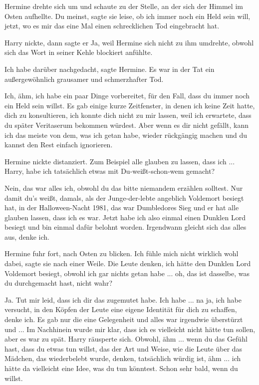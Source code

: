 Hermine drehte sich um und schaute zu der Stelle, an der sich der Himmel im
Osten aufhellte. \glqq{}Du meinst\grqq{}, sagte sie leise, \glqq{}ob ich immer
noch ein Held sein will, jetzt, wo es mir das eine Mal einen schrecklichen Tod
eingebracht hat.\grqq{}

Harry nickte, dann sagte er \glqq{}Ja\grqq{}, weil Hermine sich nicht zu ihm
umdrehte, obwohl sich das Wort in seiner Kehle blockiert anfühlte.

\glqq{}Ich habe darüber nachgedacht\grqq{}, sagte Hermine. \glqq{}Es war in der
Tat ein außergewöhnlich grausamer und schmerzhafter Tod.\grqq{}

\glqq{}Ich, ähm, ich habe ein paar Dinge vorbereitet, für den Fall, dass du immer
noch ein Held sein willst. Es gab einige kurze Zeitfenster, in denen ich keine
Zeit hatte, dich zu konsultieren, ich konnte dich nicht zu mir lassen, weil ich
erwartete, dass du später Veritaserum bekommen würdest. Aber wenn es dir nicht
gefällt, kann ich das meiste von dem, was ich getan habe, wieder rückgängig
machen und du kannst den Rest einfach ignorieren.\grqq{}

Hermine nickte distanziert. \glqq{}Zum Beispiel alle glauben zu lassen, dass
ich ... Harry, habe ich tatsächlich etwas mit Du-weißt-schon-wem gemacht?\grqq{}

\glqq{}Nein, das war alles ich, obwohl du das bitte niemandem erzählen solltest.
Nur damit du's weißt, damals, als der Junge-der-lebte angeblich Voldemort
besiegt hat, in der Halloween-Nacht 1981, das war Dumbledores Sieg und er hat
alle glauben lassen, dass ich es war. Jetzt habe ich also einmal einen Dunklen
Lord besiegt und bin einmal dafür belohnt worden. Irgendwann gleicht sich das
alles aus, denke ich.\grqq{}

Hermine fuhr fort, nach Osten zu blicken. \glqq{}Ich fühle mich nicht wirklich
wohl dabei\grqq{}, sagte sie nach einer Weile. \glqq{}Die Leute denken, ich hätte
den Dunklen Lord Voldemort besiegt, obwohl ich gar nichts getan habe ... oh, das
ist dasselbe, was du durchgemacht hast, nicht wahr?\grqq{}

\glqq{}Ja. Tut mir leid, dass ich dir das zugemutet habe. Ich habe ... na ja, ich
habe versucht, in den Köpfen der Leute eine eigene Identität für dich zu
schaffen, denke ich. Es gab nur die eine Gelegenheit und alles war irgendwie
überstürzt und ... Im Nachhinein wurde mir klar, dass ich es vielleicht nicht
hätte tun sollen, aber es war zu spät.\grqq{} Harry räusperte sich. \glqq{}
Obwohl, ähm ... wenn du das Gefühl hast, dass du etwas tun willst, das der Art
und Weise, wie die Leute über das Mädchen, das wiederbelebt wurde, denken,
tatsächlich würdig ist, ähm ... ich hätte da vielleicht eine Idee, was du tun
könntest. Schon sehr bald, wenn du willst.\grqq{}

